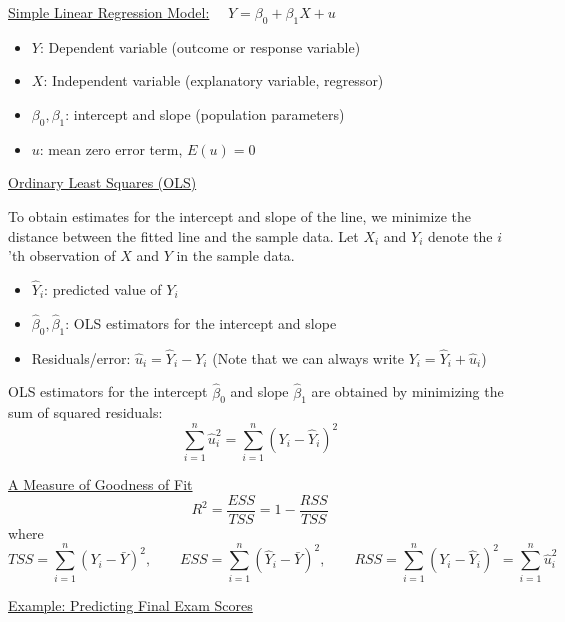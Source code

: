 \documentclass{./../../Latex/handout}
\begin{document}
\thispagestyle{plain}

\underline{Simple Linear Regression Model:} $\quad Y = \beta_0 + \beta_1 X + u $
\begin{itemize}
    \setlength{\itemsep}{0pt}
  \item $Y$: Dependent variable (outcome or response variable)  \item $X$: Independent variable (explanatory variable, regressor)
  \item $\beta_0, \beta_1$: intercept and slope (population parameters)
  \item $u$: mean zero error term, $E(u)=0$
\end{itemize}

\underline{Ordinary Least Squares (OLS)} 

To obtain estimates for the intercept and slope of the line, we minimize the distance between the fitted line and the sample data. Let $X_i$ and $Y_i$ denote the $i$'th observation of $X$ and $Y$ in the sample data. \vspace{-0.5em}
\begin{itemize}
    \setlength{\itemsep}{0pt} 
  \item $\hat{Y}_i$: predicted value of $Y_i$
  \item $\hat{\beta}_0, \hat{\beta}_1$: OLS estimators for the intercept and slope
  \item Residuals/error: $ \hat{u}_i = \hat{Y}_i -Y_i$ (Note that we can always write $ Y_i = \hat{Y}_i + \hat{u}_i $)
\end{itemize}
OLS estimators for the intercept $\hat{\beta}_0$ and slope $\hat{\beta}_1$ are obtained by minimizing the sum of squared residuals: $$ \sum_{i=1}^n \hat{u}_i^2  = \sum_{i=1}^n (Y_i - \hat{Y}_i)^2   $$

\underline{A Measure of Goodness of Fit}
$$ R^2 = \frac{ESS}{TSS} = 1-\frac{RSS}{TSS} $$ 
where $$ TSS = \sum_{i=1}^n (Y_i-\bar{Y})^2, \quad \quad ESS = \sum_{i=1}^n (\hat{Y}_i-\bar{Y})^2, \quad  \quad RSS = \sum_{i=1}^n (Y_i-\hat{Y}_i)^2 =\sum_{i=1}^n \hat{u}_i^2$$

\newpage
\underline{Example: Predicting Final Exam Scores} \\~\\
\end{document}
